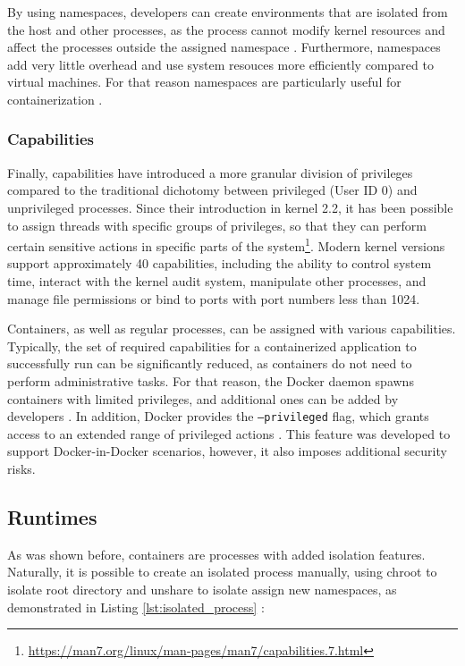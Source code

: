 By using namespaces, developers can create environments that are isolated from the host and other processes, as the process cannot modify kernel resources and affect the processes outside the assigned namespace \cite{d:dockersecurity}. Furthermore, namespaces add very little overhead and use system resouces more efficiently compared to virtual machines. For that reason namespaces are particularly useful for containerization \cite{c:1}.

\subsubsection{Capabilities}

Finally, capabilities have introduced a more granular division of privileges compared to the traditional dichotomy between privileged (User ID 0) and unprivileged processes. Since their introduction in kernel 2.2, it has been possible to assign threads with specific groups of privileges, so that they can perform certain sensitive actions in specific parts of the system\footnote{\url{https://man7.org/linux/man-pages/man7/capabilities.7.html}}. Modern kernel versions support approximately 40 capabilities, including the ability to control system time, interact with the kernel audit system, manipulate other processes, and manage file permissions or bind to ports with port numbers less than 1024.

Containers, as well as regular processes, can be assigned with various capabilities. Typically, the set of required capabilities for a containerized application to successfully run can be significantly reduced, as containers do not need to perform administrative tasks. For that reason, the Docker daemon spawns containers with limited privileges, and additional ones can be added by developers \cite{d:dockersecurity}. In addition, Docker provides the \texttt{--privileged} flag, which grants access to an extended range of privileged actions \cite{d:dockerrun}. This feature was developed to support Docker-in-Docker scenarios, however, it also imposes additional security risks.

\clearpage
\subsection{Runtimes}

As was shown before, containers are processes with added isolation features. Naturally, it is possible to create an isolated process manually, using chroot to isolate root directory and unshare to isolate assign new namespaces, as demonstrated in Listing \ref{lst:isolated_process} \cite{book:rice}:

